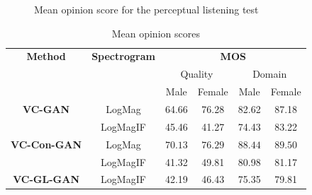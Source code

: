 \begin{figure}[h]
    \centering
    \qquad
    \caption[Mean opinion score]{Mean opinion score for the perceptual listening test}
    \label{fig:mos_quality_domain}
\end{figure}
\begin{table}[h]
    \centering
    \begin{tabular}{cccccc}
    \toprule
    \textbf{Method} & \textbf{Spectrogram} & \multicolumn{4}{c}{\textbf{MOS}} \\
    & & \multicolumn{2}{c}{Quality} & \multicolumn{2}{c}{Domain} \\
    & & Male&Female & Male&Female\\
    \midrule
    \textbf{VC-GAN} & LogMag & 64.66&76.28&82.62&87.18\\
                    &LogMagIF &45.46& 41.27&74.43&83.22 \\    
    \textbf{VC-Con-GAN}&LogMag & $\mathbf{70.13}$&$\mathbf{76.29}$& $\mathbf{88.44}$ & $\mathbf{89.50}$\\
    &LogMagIF &41.32&49.81&80.98&81.17\\
     \textbf{VC-GL-GAN} &LogMagIF&42.19&46.43&75.35&79.81 \\
    \bottomrule    
    \end{tabular}
    \caption[Mean Opinion Score]{Mean opinion scores}
    \label{tab:mos}
\end{table}

